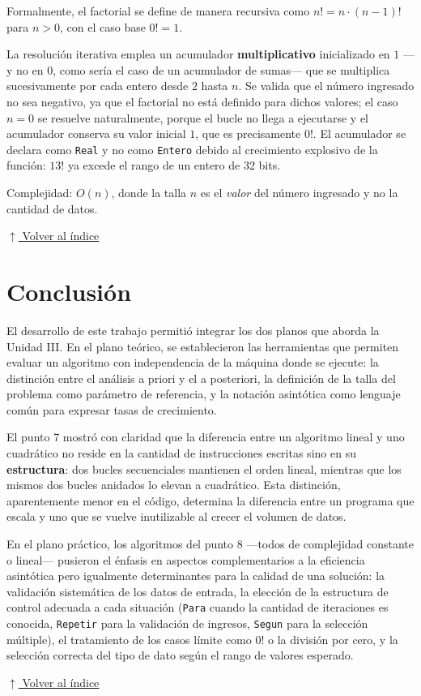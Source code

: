 \documentclass[12pt]{article}
\newcommand{\codigo}[1]{\texttt{\small #1}}
\newcommand{\pseudocodigo}[2]{%
}
\newcommand{\volverindice}{%
    \vspace{1em}%
    \begin{flushright}%
        \hyperlink{indice}{\small $\uparrow$ Volver al índice}%
    \end{flushright}%
}
\begin{document}
Formalmente, el factorial se define de manera recursiva como $n! = n \cdot (n-1)!$ para $n > 0$, con el caso base $0! = 1$.

La resolución iterativa emplea un acumulador \textbf{multiplicativo} inicializado en $1$ —y no en $0$, como sería el caso de un acumulador de sumas— que se multiplica sucesivamente por cada entero desde $2$ hasta $n$. Se valida que el número ingresado no sea negativo, ya que el factorial no está definido para dichos valores; el caso $n = 0$ se resuelve naturalmente, porque el bucle no llega a ejecutarse y el acumulador conserva su valor inicial $1$, que es precisamente $0!$. El acumulador se declara como \codigo{Real} y no como \codigo{Entero} debido al crecimiento explosivo de la función: $13!$ ya excede el rango de un entero de 32 bits.

\pseudocodigo{ej08_g_factorial}{Cálculo del factorial de un número por método iterativo}

Complejidad: $O(n)$, donde la talla $n$ es el \emph{valor} del número ingresado y no la cantidad de datos.

\volverindice
\newpage


\section*{Conclusión}

El desarrollo de este trabajo permitió integrar los dos planos que aborda la Unidad III. En el plano teórico, se establecieron las herramientas que permiten evaluar un algoritmo con independencia de la máquina donde se ejecute: la distinción entre el análisis a priori y el a posteriori, la definición de la talla del problema como parámetro de referencia, y la notación asintótica como lenguaje común para expresar tasas de crecimiento.

El punto 7 mostró con claridad que la diferencia entre un algoritmo lineal y uno cuadrático no reside en la cantidad de instrucciones escritas sino en su \textbf{estructura}: dos bucles secuenciales mantienen el orden lineal, mientras que los mismos dos bucles anidados lo elevan a cuadrático. Esta distinción, aparentemente menor en el código, determina la diferencia entre un programa que escala y uno que se vuelve inutilizable al crecer el volumen de datos.

En el plano práctico, los algoritmos del punto 8 —todos de complejidad constante o lineal— pusieron el énfasis en aspectos complementarios a la eficiencia asintótica pero igualmente determinantes para la calidad de una solución: la validación sistemática de los datos de entrada, la elección de la estructura de control adecuada a cada situación (\codigo{Para} cuando la cantidad de iteraciones es conocida, \codigo{Repetir} para la validación de ingresos, \codigo{Segun} para la selección múltiple), el tratamiento de los casos límite como $0!$ o la división por cero, y la selección correcta del tipo de dato según el rango de valores esperado.

\volverindice
\end{document}
